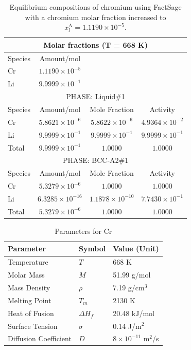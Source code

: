 \begin{table}[ht]
	\centering
	\label{tab:molar_fractions_cr_li_updated}
	\begin{tabular}{lccc}
	\hline
	\multicolumn{4}{c}{Molar fractions (T = 668 K)} \\
	\hline
	Species & Amount/mol & & \\
	\hline
	Cr & $1.1190 \times 10^{-5}$ & & \\
	Li & $9.9999 \times 10^{-1}$ & & \\
	\hline
	\multicolumn{4}{c}{PHASE: Liquid\#1} \\
	\hline
	Species & Amount/mol & Mole Fraction & Activity \\
	\hline
	Cr & $5.8621 \times 10^{-6}$ & $5.8622 \times 10^{-6}$ & $4.9364 \times 10^{-2}$ \\
	Li & $9.9999 \times 10^{-1}$ & $9.9999 \times 10^{-1}$ & $9.9999 \times 10^{-1}$ \\
	Total & $9.9999 \times 10^{-1}$ & $1.0000$ & $1.0000$ \\
	\hline
	\multicolumn{4}{c}{PHASE: BCC-A2\#1} \\
	\hline
	Species & Amount/mol & Mole Fraction & Activity \\
	\hline
	Cr & $5.3279 \times 10^{-6}$ & $1.0000$ & $1.0000$ \\
	Li & $6.3285 \times 10^{-16}$ & $1.1878 \times 10^{-10}$ & $7.7430 \times 10^{-1}$ \\
	Total & $5.3279 \times 10^{-6}$ & $1.0000$ & $1.0000$ \\
	\hline
	\end{tabular}
	\caption{Equilibrium compositions of chromium using FactSage with a chromium molar fraction increased to $x^{\text{A}}_{l} = 1.1190 \times 10^{-5}$.}
\end{table}


\begin{table}[h]
    \centering
    \begin{tabular}{|l|l|l|}
    \hline
    \textbf{Parameter} & \textbf{Symbol} & \textbf{Value (Unit)} \\ \hline
    Temperature        & $T$             & 668 K                 \\ \hline
    Molar Mass         & $M$             & 51.99 g/mol         \\ \hline
    Mass Density       & $\rho$          & 7.19 g/cm$^3$         \\ \hline
    Melting Point      & $T_m$           & 2130 K                \\ \hline
    Heat of Fusion     & $\Delta H_f$    & 20.48 kJ/mol           \\ \hline
    Surface Tension    & $\sigma$        & 0.14 J/m$^2$          \\ \hline
	Diffusion Coefficient & $D$          & $8 \times 10^{-11}$ m$^2$/s \\ \hline
    \end{tabular}
    \caption{Parameters for Cr}
    \label{tab:params_Fe}
\end{table}

